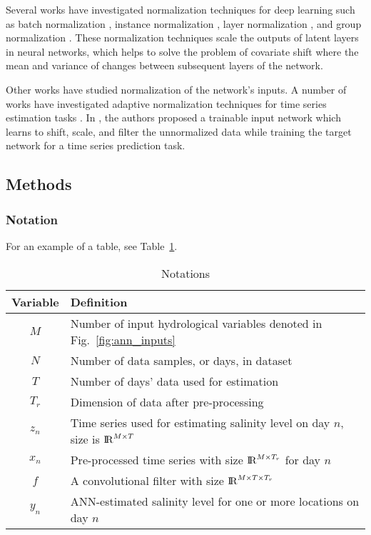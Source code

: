 Several works have investigated normalization techniques for deep learning such as batch normalization \cite{ref:ioffe2015batch}, instance normalization \cite{ref:huang2017instance}, layer normalization \cite{ref:ba2016layer}, and group normalization \cite{ref:wu2018group}. These normalization techniques scale the outputs of latent layers in neural networks, which helps to solve the problem of covariate shift \cite{ref:ioffe2015batch} where the mean and variance of changes between subsequent layers of the network.

Other works have studied normalization of the network's inputs. A number of works have investigated adaptive normalization techniques for time series estimation tasks \cite{ref:ogasawara2010adaptive, ref:nayak2014impact, ref:shao2015self}. In \cite{ref:passalis2019dain}, the authors proposed a trainable input network which learns to shift, scale, and filter the unnormalized data while training the target network for a time series prediction task.

\subsection{Methods}

\blindtext

\subsubsection{Notation}

For an example of a table, see Table~\ref{table:notation}.

\begin{table}[htb]
	\caption{Notations}
	\label{table:notation}
	\centering
	\begin{tabular}[]{c|l}
		\toprule
		Variable & Definition \\
		\midrule
		$M$ & Number of input hydrological variables denoted in Fig.~\ref{fig:ann_inputs}\\
		\hline
		$N$ & Number of data samples, or days, in dataset \\
		\hline
		$T$ & Number of days' data used for estimation \\
		\hline
		$T_r$ & Dimension of data after pre-processing\\
		\hline
		$z_{n}$ & Time series used for estimating salinity level on day $n$, size is ${\rm I\!R}^{M\times T}$ \\
		\hline
		$x_{n}$ & Pre-processed time series with size ${\rm I\!R}^{M\times T_r}$ for day $n$\\
		\hline
		$f$ & A convolutional filter with size ${\rm I\!R}^{M \times T \times T_r}$ \\
		\hline
		$y_{n}$ & ANN-estimated salinity level for one or more locations on day $n$ \\
		\bottomrule
	\end{tabular}
\end{table}

